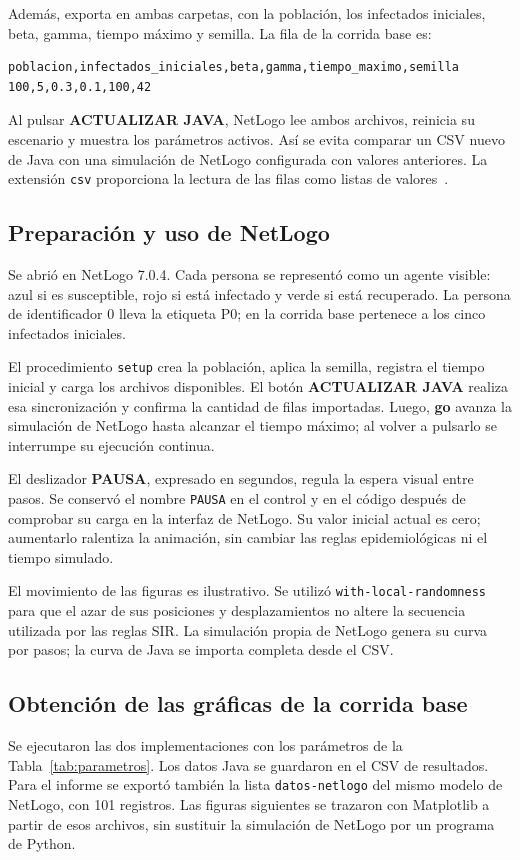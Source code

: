 \documentclass[11pt,a4paper]{article}
\begin{document}
Además, exporta  en ambas carpetas, con la población, los infectados iniciales, beta, gamma, tiempo máximo y semilla. La fila de la corrida base es:
{\small
\begin{verbatim}
poblacion,infectados_iniciales,beta,gamma,tiempo_maximo,semilla
100,5,0.3,0.1,100,42
\end{verbatim}
}

Al pulsar \textbf{ACTUALIZAR JAVA}, NetLogo lee ambos archivos, reinicia su escenario y muestra los parámetros activos. Así se evita comparar un CSV nuevo de Java con una simulación de NetLogo configurada con valores anteriores. La extensión \texttt{csv} proporciona la lectura de las filas como listas de valores~\cite{csv}.

\subsection{Preparación y uso de NetLogo}
Se abrió  en NetLogo 7.0.4. Cada persona se representó como un agente visible: azul si es susceptible, rojo si está infectado y verde si está recuperado. La persona de identificador 0 lleva la etiqueta P0; en la corrida base pertenece a los cinco infectados iniciales.

El procedimiento \texttt{setup} crea la población, aplica la semilla, registra el tiempo inicial y carga los archivos disponibles. El botón \textbf{ACTUALIZAR JAVA} realiza esa sincronización y confirma la cantidad de filas importadas. Luego, \textbf{go} avanza la simulación de NetLogo hasta alcanzar el tiempo máximo; al volver a pulsarlo se interrumpe su ejecución continua.

El deslizador \textbf{PAUSA}, expresado en segundos, regula la espera visual entre pasos. Se conservó el nombre \texttt{PAUSA} en el control y en el código después de comprobar su carga en la interfaz de NetLogo. Su valor inicial actual es cero; aumentarlo ralentiza la animación, sin cambiar las reglas epidemiológicas ni el tiempo simulado.

El movimiento de las figuras es ilustrativo. Se utilizó \texttt{with-local-randomness} para que el azar de sus posiciones y desplazamientos no altere la secuencia utilizada por las reglas SIR. La simulación propia de NetLogo genera su curva por pasos; la curva de Java se importa completa desde el CSV.

\subsection{Obtención de las gráficas de la corrida base}
Se ejecutaron las dos implementaciones con los parámetros de la Tabla~\ref{tab:parametros}. Los datos Java se guardaron en el CSV de resultados. Para el informe se exportó también la lista \texttt{datos-netlogo} del mismo modelo de NetLogo, con 101 registros. Las figuras siguientes se trazaron con Matplotlib a partir de esos archivos, sin sustituir la simulación de NetLogo por un programa de Python.
\end{document}
